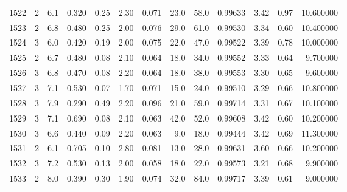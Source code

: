 \begin{tabular}{lrrrrrrrrrrrr}
1522 &        2 &            6.1 &             0.320 &         0.25 &            2.30 &      0.071 &                 23.0 &                  58.0 &  0.99633 &  3.42 &       0.97 &  10.600000 \\
1523 &        2 &            6.8 &             0.480 &         0.25 &            2.00 &      0.076 &                 29.0 &                  61.0 &  0.99530 &  3.34 &       0.60 &  10.400000 \\
1524 &        3 &            6.0 &             0.420 &         0.19 &            2.00 &      0.075 &                 22.0 &                  47.0 &  0.99522 &  3.39 &       0.78 &  10.000000 \\
1525 &        2 &            6.7 &             0.480 &         0.08 &            2.10 &      0.064 &                 18.0 &                  34.0 &  0.99552 &  3.33 &       0.64 &   9.700000 \\
1526 &        3 &            6.8 &             0.470 &         0.08 &            2.20 &      0.064 &                 18.0 &                  38.0 &  0.99553 &  3.30 &       0.65 &   9.600000 \\
1527 &        3 &            7.1 &             0.530 &         0.07 &            1.70 &      0.071 &                 15.0 &                  24.0 &  0.99510 &  3.29 &       0.66 &  10.800000 \\
1528 &        3 &            7.9 &             0.290 &         0.49 &            2.20 &      0.096 &                 21.0 &                  59.0 &  0.99714 &  3.31 &       0.67 &  10.100000 \\
1529 &        3 &            7.1 &             0.690 &         0.08 &            2.10 &      0.063 &                 42.0 &                  52.0 &  0.99608 &  3.42 &       0.60 &  10.200000 \\
1530 &        3 &            6.6 &             0.440 &         0.09 &            2.20 &      0.063 &                  9.0 &                  18.0 &  0.99444 &  3.42 &       0.69 &  11.300000 \\
1531 &        2 &            6.1 &             0.705 &         0.10 &            2.80 &      0.081 &                 13.0 &                  28.0 &  0.99631 &  3.60 &       0.66 &  10.200000 \\
1532 &        3 &            7.2 &             0.530 &         0.13 &            2.00 &      0.058 &                 18.0 &                  22.0 &  0.99573 &  3.21 &       0.68 &   9.900000 \\
1533 &        2 &            8.0 &             0.390 &         0.30 &            1.90 &      0.074 &                 32.0 &                  84.0 &  0.99717 &  3.39 &       0.61 &   9.000000 \\

\end{tabular}
